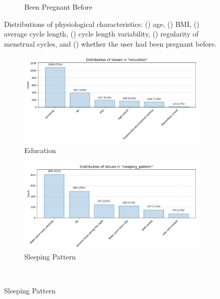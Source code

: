 \documentclass[11pt]{article}
\begin{document}
\begin{figure}[h]
\begin{subfigure}{0.45\textwidth}
    \caption{Been Pregnant Before}
    \label{fig:dist_prior_preg}
  \end{subfigure}
  \caption{
    Distributions of physiological characteristics: 
    () age, 
    () BMI, 
    () average cycle length, 
    () cycle length variability, 
    () regularity of menstrual cycles, and 
    () whether the user had been pregnant before.
  }
\end{figure}

\begin{figure}[h]
  \centering
  \begin{subfigure}{0.45\textwidth}
    \includegraphics[width=\linewidth]{plots/education.jpg}
    \caption{Education}
    \label{fig:dist_education}
  \end{subfigure}
  \hfill
  \begin{subfigure}{0.45\textwidth}
    \includegraphics[width=\linewidth]{plots/sleeping_pattern.jpg}
    \caption{Sleeping Pattern}
    \label{fig:dist_sleep}
  \end{subfigure}
  \\

\end{figure}
\end{document}
